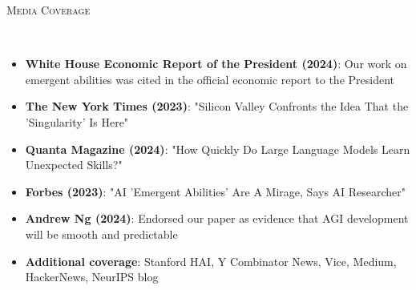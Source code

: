\documentclass{article}
\newenvironment{changemargin}[2]{%
  \begin{list}{}{%
    \setlength{\topsep}{0pt}%
    \setlength{\leftmargin}{#1}%
    \setlength{\rightmargin}{#2}%
    \setlength{\listparindent}{\parindent}%
    \setlength{\itemindent}{\parindent}%
    \setlength{\parsep}{\parskip}%
  }%
  \item[]}{\end{list}
}
\newcommand{\lineover}{
	\begin{changemargin}{-0.05in}{-0.05in}
		\vspace*{-8pt}
		\hrulefill \\
		\vspace*{-2pt}
	\end{changemargin}
}
\newcommand{\header}[1]{
	\begin{changemargin}{-0.5in}{-0.5in}
		\scshape{#1}\\
  	\lineover
	\end{changemargin}
}
\newenvironment{body} {
	\vspace*{-16pt}
	\begin{changemargin}{-0.25in}{-0.5in}
  }	
	{\end{changemargin}
}
\begin{document}

\header{Media Coverage}
\begin{body}
\vspace{16pt}
\begin{itemize} \itemsep -2pt
    \item \textbf{White House Economic Report of the President (2024)}: Our work on emergent abilities was cited in the official economic report to the President
    \item \textbf{The New York Times (2023)}: "Silicon Valley Confronts the Idea That the 'Singularity' Is Here"
    \item \textbf{Quanta Magazine (2024)}: "How Quickly Do Large Language Models Learn Unexpected Skills?"
    \item \textbf{Forbes (2023)}: "AI 'Emergent Abilities' Are A Mirage, Says AI Researcher"
    \item \textbf{Andrew Ng (2024)}: Endorsed our paper as evidence that AGI development will be smooth and predictable
    \item \textbf{Additional coverage}: Stanford HAI, Y Combinator News, Vice, Medium, HackerNews, NeurIPS blog
\end{itemize}
\end{body}

\end{document}
